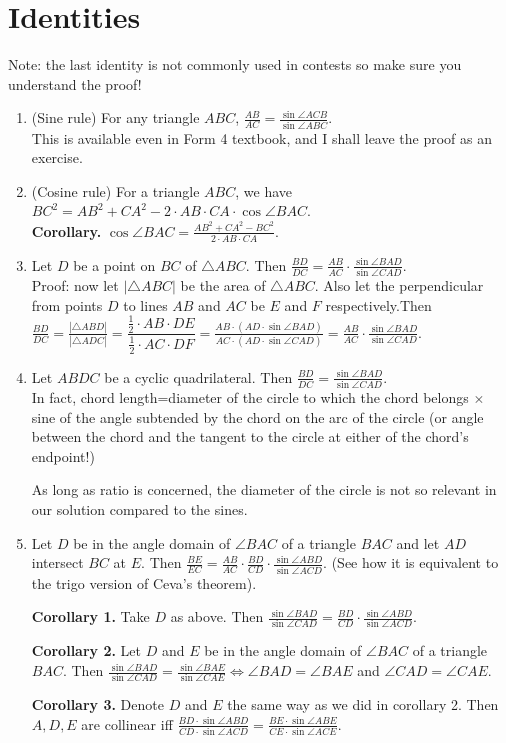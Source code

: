 \documentclass[11pt,a4paper]{article}
\begin{document}
\section {Identities}
Note: the last identity is not commonly used in contests so make sure you understand the proof!
\begin {enumerate}
\item (Sine rule) For any triangle $ABC$, $\frac{AB}{AC}=\frac{\sin\angle ACB}{\sin\angle ABC}.$
\\This is available even in Form 4 textbook, and I shall leave the proof as an exercise.

\item (Cosine rule) For a triangle $ABC$, we have $BC^{2}=AB^{2}+CA^{2}-2\cdot AB\cdot CA\cdot\cos\angle BAC$.
\\\textbf {Corollary.} $\cos\angle BAC=\frac{AB^{2}+CA^{2}-BC^{2}}{2\cdot AB\cdot CA}.$

\item Let $D$ be a point on $BC$ of $\triangle ABC$. Then $\frac {BD}{DC}=\frac{AB}{AC}\cdot\frac{\sin\angle BAD}{\sin\angle CAD}$.
\\Proof: now let $|\triangle ABC|$ be the area of $\triangle ABC$. Also let the perpendicular from points $D$ to lines $AB$ and $AC$ be $E$ and $F$ respectively.Then $\frac {BD}{DC}=\frac{|\triangle ABD|}{|\triangle ADC|}=\dfrac{\frac{1}{2}\cdot AB\cdot DE}{\frac{1}{2}\cdot AC\cdot DF}=\frac{AB\cdot (AD\cdot\sin\angle BAD)}{AC\cdot (AD\cdot\sin\angle CAD)}=\frac{AB}{AC}\cdot\frac{\sin\angle BAD}{\sin\angle CAD}.$
\item Let $ABDC$ be a cyclic quadrilateral. Then $\frac {BD}{DC}=\frac{\sin\angle BAD}{\sin\angle CAD}$.
\\In fact, chord length=diameter of the circle to which the chord belongs $\times$ sine of the angle subtended by the chord on the arc of the circle (or angle between the chord and the tangent to the circle at either of the chord's endpoint!)

As long as ratio is concerned, the diameter of the circle is not so relevant in our solution compared to the sines.

\item Let $D$ be in the angle domain of $\angle BAC$ of a triangle $BAC$ and let $AD$ intersect $BC$ at $E$. Then $\frac{BE}{EC}=\frac{AB}{AC}\cdot\frac{BD}{CD}\cdot\frac{\sin\angle ABD}{\sin\angle ACD}$. (See how it is equivalent to the trigo version of Ceva's theorem).

\textbf {Corollary 1.} Take $D$ as above. Then $\frac{\sin\angle BAD}{\sin\angle CAD}=\frac{BD}{CD}\cdot\frac{\sin\angle ABD}{\sin\angle ACD}.$

\textbf {Corollary 2.}  Let $D$ and $E$ be in the angle domain of $\angle BAC$ of a triangle $BAC$. Then $\frac{\sin\angle BAD}{\sin\angle CAD}=\frac{\sin\angle BAE}{\sin\angle CAE}\iff\angle BAD=\angle BAE$ and $\angle CAD=\angle CAE$.

\textbf {Corollary 3.} Denote $D$ and $E$ the same way as we did in corollary 2. Then $A, D, E$ are collinear iff $\frac{BD\cdot\sin\angle ABD}{CD\cdot\sin\angle ACD}=\frac{BE\cdot\sin\angle ABE}{CE\cdot\sin\angle ACE}$. 

\end {enumerate}
\end{document}
